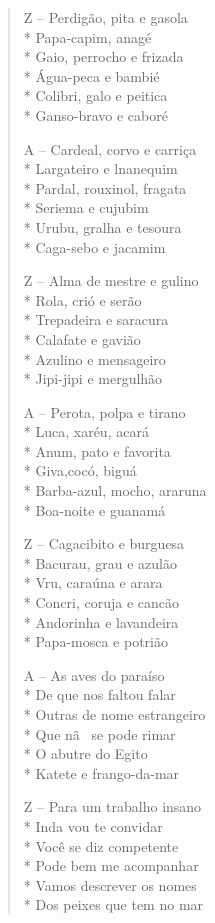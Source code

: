 \begin{verse}
Z -- Perdigão, pita e gasola\\*
Papa-capim, anagé\\*
Gaio, perrocho e frizada\\*
Água-peca e bambié\\*
Colibri, galo e peitica\\*
Ganso-bravo e caboré

A -- Cardeal, corvo e carriça\\*
Largateiro e lnanequim\\*
Pardal, rouxinol, fragata\\*
Seriema e cujubim\\*
Urubu, gralha e tesoura\\*
Caga-sebo e jacamim

Z -- Alma de mestre e gulino\\*
Rola, crió e serão\\*
Trepadeira e saracura\\*
Calafate e gavião\\*
Azulino e mensageiro\\*
Jipi-jipi e mergulhão

A -- Perota, polpa e tirano\\*
Luca, xaréu, acará\\*
Anum, pato e favorita\\*
Giva,cocó, biguá\\*
Barba-azul, mocho, araruna\\*
Boa-noite e guanamá

Z -- Cagacibito e burguesa\\*
Bacurau, grau e azulão\\*
Vru, caraúna e arara\\*
Concri, coruja e cancão\\*
Andorinha e lavandeira\\*
Papa-mosca e potrião

A -- As aves do paraíso\\*
De que nos faltou falar\\*
Outras de nome estrangeiro\\*
Que nã~ se pode rimar\\*
O abutre do Egito\\*
Katete e frango-da-mar

Z -- Para um trabalho insano\\*
Inda vou te convidar\\*
Você se diz competente\\*
Pode bem me acompanhar\\*
Vamos descrever os nomes\\*
Dos peixes que tem no mar


\end{verse}
